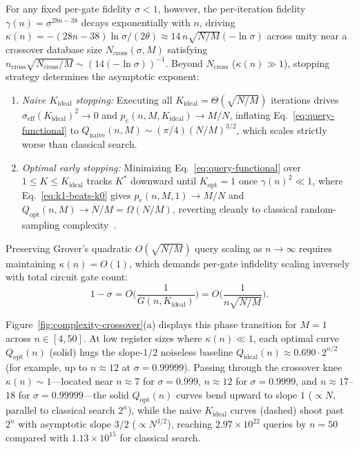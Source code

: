 For any fixed per-gate fidelity $\sigma < 1$, however, the per-iteration fidelity $\gamma(n) = \sigma^{28n - 38}$ decays exponentially with $n$, driving $\kappa(n) = -(28n - 38)\ln\sigma / (2\theta) \approx 14\,n\sqrt{N/M}(-\ln\sigma)$ across unity near a crossover database size $N_{\mathrm{cross}}(\sigma, M)$ satisfying $n_{\mathrm{cross}}\sqrt{N_{\mathrm{cross}}/M} \sim (14(-\ln\sigma))^{-1}$. Beyond $N_{\mathrm{cross}}$ ($\kappa(n) \gg 1$), stopping strategy determines the asymptotic exponent:
\begin{enumerate}
\item \emph{Naive $K_{\mathrm{ideal}}$ stopping:} Executing all $K_{\mathrm{ideal}} = \Theta(\sqrt{N/M})$ iterations drives $\sigma_{\mathrm{eff}}(K_{\mathrm{ideal}})^2 \to 0$ and $p_e(n, M, K_{\mathrm{ideal}}) \to M/N$, inflating Eq.~\eqref{eq:query-functional} to $Q_{\mathrm{naive}}(n, M) \sim (\pi/4)(N/M)^{3/2}$, which scales strictly worse than classical search.
\item \emph{Optimal early stopping:} Minimizing Eq.~\eqref{eq:query-functional} over $1 \le K \le K_{\mathrm{ideal}}$ tracks $K^*$ downward until $K_{\mathrm{opt}} = 1$ once $\gamma(n)^2 \ll 1$, where Eq.~\eqref{eq:k1-beats-k0} gives $p_e(n, M, 1) \to M/N$ and $Q_{\mathrm{opt}}(n, M) \to N/M = \Omega(N/M)$, reverting cleanly to classical random-sampling complexity~\cite{Shenvi2003,Salas2008,Cohn2016}.
\end{enumerate}
Preserving Grover's quadratic $O(\sqrt{N/M})$ query scaling as $n \to \infty$ requires maintaining $\kappa(n) = O(1)$, which demands per-gate infidelity scaling inversely with total circuit gate count:
\begin{equation}
1 - \sigma = O\biggl(\frac{1}{G(n, K_{\mathrm{ideal}})}\biggr) = O\biggl(\frac{1}{n\sqrt{N/M}}\biggr).
\label{eq:fidelity-scaling-law}
\end{equation}

Figure~\ref{fig:complexity-crossover}(a) displays this phase transition for $M = 1$ across $n \in [4, 50]$. At low register sizes where $\kappa(n) \ll 1$, each optimal curve $Q_{\mathrm{opt}}(n)$ (solid) hugs the slope-$1/2$ noiseless baseline $Q_{\mathrm{ideal}}(n) \approx 0.690 \cdot 2^{n/2}$ (for example, up to $n \approx 12$ at $\sigma = 0.99999$). Passing through the crossover knee $\kappa(n) \sim 1$---located near $n \approx 7$ for $\sigma = 0.999$, $n \approx 12$ for $\sigma = 0.9999$, and $n \approx 17$--$18$ for $\sigma = 0.99999$---the solid $Q_{\mathrm{opt}}(n)$ curves bend upward to slope $1$ ($\propto N$, parallel to classical search $2^n$), while the naive $K_{\mathrm{ideal}}$ curves (dashed) shoot past $2^n$ with asymptotic slope $3/2$ ($\propto N^{3/2}$), reaching $2.97 \times 10^{22}$ queries by $n = 50$ compared with $1.13 \times 10^{15}$ for classical search.

